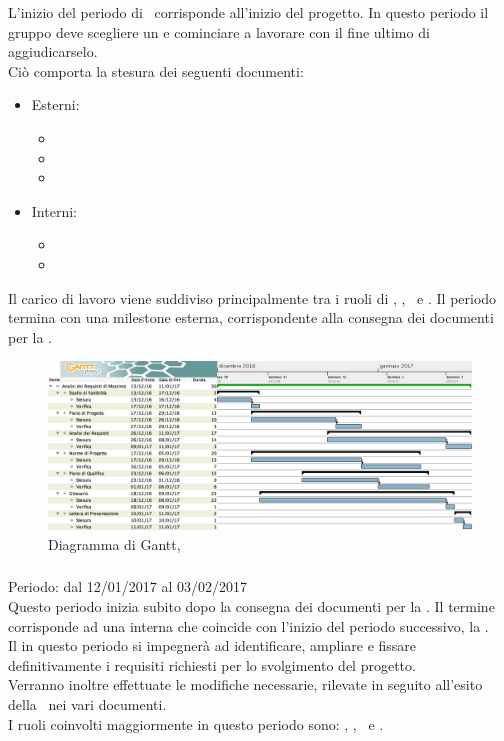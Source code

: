 L'inizio del periodo di \ARM\ corrisponde all'inizio del progetto. In questo periodo il gruppo deve scegliere un  e cominciare a lavorare con il fine ultimo di aggiudicarselo.\\
Ciò comporta la stesura dei seguenti documenti:
 \begin{itemize}
 \item Esterni:
 	\begin{itemize}
 	 \item \AdR
 	 \item \PdP
	 \item \PdQ
 	\end{itemize}
 \item  Interni:
	\begin{itemize}
	\item \SdF
	\item \NdP
	\end{itemize} 
 \end{itemize}
 Il carico di lavoro viene suddiviso principalmente tra i ruoli di \An, \Am, \Ver\ e \Pm.
 Il periodo termina con una milestone esterna, corrispondente alla consegna dei documenti per la \RR.
 
 \begin{figure}[H]
	\centering 
	\includegraphics[scale=0.4]{Immagini/Gantt/ARM.png}
	\caption{Diagramma di Gantt, \ARM}
\end{figure}
\newpage
\subsubsection{\ARD}
Periodo: dal 12/01/2017 al 03/02/2017 \\

Questo periodo inizia subito dopo la consegna dei documenti per la \RR. Il termine corrisponde ad una  interna che coincide con l'inizio del periodo successivo, la \PA.\\
Il  in questo periodo si impegnerà ad identificare, ampliare e fissare definitivamente i requisiti richiesti per lo svolgimento del progetto.\\
Verranno inoltre effettuate le modifiche necessarie, rilevate in seguito all'esito della \RR\, nei vari documenti.\\
I ruoli coinvolti maggiormente in questo periodo sono: \An, \Am, \Pm\ e \Ver.

